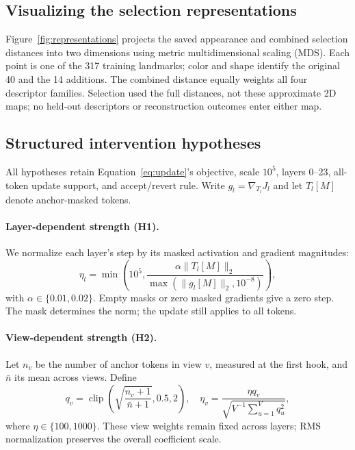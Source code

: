 \documentclass[sigconf,nonacm]{acmart}
\begin{document}
\subsection{Visualizing the selection representations}
Figure~\ref{fig:representations} projects the saved appearance and combined selection distances into two dimensions using metric multidimensional scaling (MDS). Each point is one of the 317 training landmarks; color and shape identify the original 40 and the 14 additions. The combined distance equally weights all four descriptor families. Selection used the full distances, not these approximate 2D maps; no held-out descriptors or reconstruction outcomes enter either map.



\subsection{Structured intervention hypotheses}
All hypotheses retain Equation~\ref{eq:update}'s objective, scale $10^5$, layers 0--23, all-token update support, and accept/revert rule. Write $g_l=\nabla_{T_l}J_l$ and let $T_l[M]$ denote anchor-masked tokens.

\paragraph{Layer-dependent strength (H1).}
We normalize each layer's step by its masked activation and gradient magnitudes:
\begin{equation}
\eta_l=\min\!\left(10^5,\frac{\alpha\|T_l[M]\|_2}{\max(\|g_l[M]\|_2,10^{-8})}\right),
\end{equation}
with $\alpha\in\{0.01,0.02\}$. Empty masks or zero masked gradients give a zero step. The mask determines the norm; the update still applies to all tokens.

\paragraph{View-dependent strength (H2).}
Let $n_v$ be the number of anchor tokens in view $v$, measured at the first hook, and $\bar n$ its mean across views. Define
\begin{equation}
q_v=\operatorname{clip}\!\left(\sqrt{\frac{n_v+1}{\bar n+1}},0.5,2\right),\quad
\eta_v=\frac{\eta q_v}{\sqrt{V^{-1}\sum_{u=1}^{V}q_u^2}},
\end{equation}
where $\eta\in\{100,1000\}$. These view weights remain fixed across layers; RMS normalization preserves the overall coefficient scale.
\end{document}
